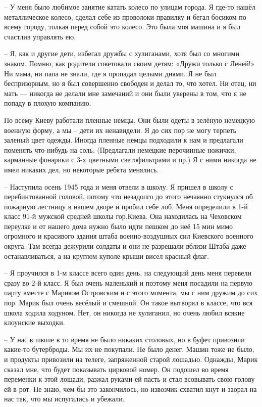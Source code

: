 – У меня было любимое занятие катать колесо по улицам города. Я где-то нашёл
металлическое колесо, сделал себе из проволоки правилку и бегал босиком по
всему городу, толкая перед собой это колесо. Это была моя машина и я был
счастлив управлять ею. 

– Я, как и другие дети, избегал дружбы с хулиганами, хотя был со многими
знаком. Помню, как родители советовали своим детям: «Дружи только с Леней!» Ни
мама, ни папа не знали, где я пропадал целыми днями. Я не был беспризорным, но
я был совершенно свободен и делал то, что хотел. Ни отец, ни мать — никогда не
делали мне замечаний и они были уверены в том, что я не попаду в плохую
компанию.

По всему Киеву работали пленные немцы. Они были одеты в зелёную немецкую
военную форму, а мы – дети их ненавидели. Я до сих пор не могу терпеть заленый
цвет одежды. Иногда пленные немцы подходили к нам и предлагали поменять
что-нибудь на соль. (Предлагали немецкие перочинные ножички, карманные
фонарики с 3-х цветными светофильтрами и пр.) Я с ними никогда не имел никаких
дел, но некоторые ребята менялись. 

– Наступила осень 1945 года и меня отвели в школу. Я пришел в школу с
перебинтованной головой, потому что незадолго до этого нечаянно стукнулся об
пожарную лестницу в нашем дворе и пробил себе лоб. Меня определили в 1-й класс
91-й мужской средней школы гор.Киева. Она находилась на Чеховском переулке и от
нашего дома нужно было идти пешком до неё 15 мин мимо огромного и красивого
здания штаба военно-воздушных сил Киевского военного округа. Там всегда
дежурили солдаты и они не разрешали вблизи Штаба даже останавливаться, а на
круглом куполе крыши висел красный флаг.

– Я проучился в 1-м классе всего один день,  на следующий день меня перевели
сразу во 2-й класс. Я был очень маленький и поэтому меня посадили на первую
парту вместе с Мариком Островским и с этого момента, мы с ним дружим до сих
пор.  Марик был очень весёлый и смешной. Он такое вытворял в классе, что вся
школа ходила ходуном. Нет, он никогда не хулиганил, но очень любил всякие
клоунские выходки.

– У нас в школе в то время не было никаких столовых,  но в буфет привозили
какие-то бутерброды. Мы их не покупали. Не было денег. Машин тоже не было, и
продукты привозили на телеге, запряженной старой лошадью. Однажды, Марик сказал
мне, что будет показывать цирковой номер. Он подошел во время переменки к этой
лошади, разжал руками ей пасть и стал всовывать свою голову ей в рот. Не знаю,
чем бы это закончилось, но извозчик схватил кнут и заорал на нас так, что мы
испугались и убежали.

